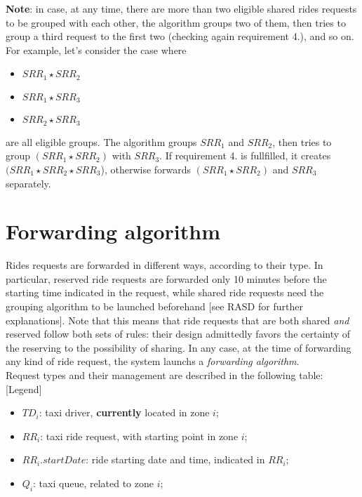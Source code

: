 	\textbf{Note}: in case, at any time, there are more than two eligible shared rides requests to be grouped with each other, the algorithm groups two of them, then tries to group a third request to the first two (checking again requirement 4.), and so on.
	For example, let's consider the case where
	\begin{itemize}
		\item $SRR_1 \star SRR_2$
		\item $SRR_1 \star SRR_3$
		\item $SRR_2 \star SRR_3$
	\end{itemize}
	are all eligible groups. The algorithm groups $SRR_1$ and $SRR_2$, then tries to group $(SRR_1 \star SRR_2)$ with $SRR_3$. If requirement 4. is fullfilled, it creates $(SRR_1 \star SRR_2 \star SRR_3$), otherwise forwards $(SRR_1 \star SRR_2)$ and $SRR_3$ separately.
	
\section{Forwarding algorithm}
	Rides requests are forwarded in different ways, according to their type. In particular, reserved ride requests are forwarded only 10 minutes before the starting time indicated in the request, while shared ride requests need the grouping algorithm to be launched beforehand [see RASD for further explanations]. Note that this means that ride requests that are both shared \textit{and} reserved follow both sets of rules: their design admittedly favors the certainty of the reserving to the possibility of sharing.
	In any case, at the time of forwarding any kind of ride request, the system launchs a \textit{forwarding algorithm}.\\
	Request types and their management are described in the following table:\\
	
	[Legend]
	\begin{itemize}
		\item $TD_i$: taxi driver, \textbf{currently} located in zone $i$;
		\item $RR_i$: taxi ride request, with starting point in zone $i$;
		\item $RR_i.startDate$: ride starting date and time, indicated in $RR_i$;
		\item $Q_i$: taxi queue, related to zone $i$;
	\end{itemize}
	
